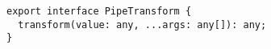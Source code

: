 \begin{verbatim}
export interface PipeTransform {
  transform(value: any, ...args: any[]): any;
}
\end{verbatim}
